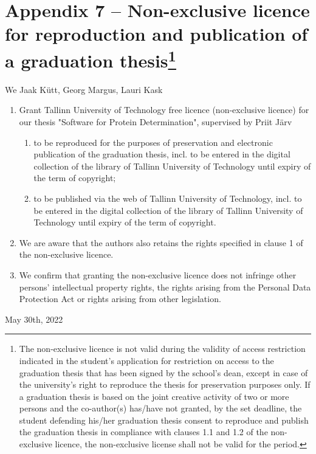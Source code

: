 \small

\chapter*{Appendix 7 – Non-exclusive licence for reproduction and publication of a graduation thesis\footnote{The non-exclusive licence is not valid during the validity of access restriction indicated in the student's application for restriction on access to the graduation thesis that has been signed by the school's dean, except in case of the university's right to reproduce the thesis for preservation purposes only. If a graduation thesis is based on the joint creative activity of two or more persons and the co-author(s) has/have not granted, by the set deadline, the student defending his/her graduation thesis consent to reproduce and publish the graduation thesis in compliance with clauses 1.1 and 1.2 of the non-exclusive licence, the non-exclusive license shall not be valid for the period.}}

We Jaak Kütt, Georg Margus, Lauri Kask
\begin{enumerate}[label*=\arabic*.]
\item Grant Tallinn University of Technology free licence (non-exclusive licence) for our thesis "Software for Protein Determination", supervised by Priit Järv
  \begin{enumerate}[label*=\arabic*.]
    \item to be reproduced for the purposes of preservation and electronic publication of the graduation thesis, incl. to be entered in the digital collection of the library of Tallinn University of Technology until expiry of the term of copyright;
    \item to be published via the web of Tallinn University of Technology, incl. to be entered in the digital collection of the library of Tallinn University of Technology until expiry of the term of copyright.
  \end{enumerate}
\item We are aware that the authors also retains the rights specified in clause 1 of the non-exclusive licence.
\item We confirm that granting the non-exclusive licence does not infringe other persons' intellectual property rights, the rights arising from the Personal Data Protection Act or rights arising from other legislation.
\end{enumerate}

May 30th, 2022

